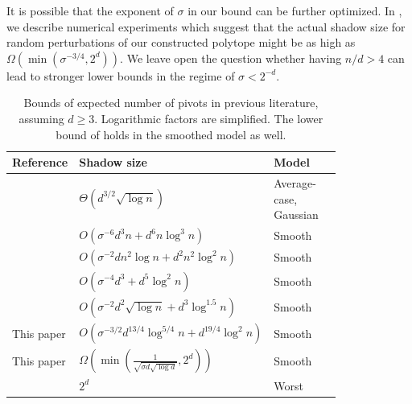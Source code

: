 \documentclass{theoretics}
\begin{document}
It is possible that the exponent of $\sigma$ in our bound can be further optimized.
In , we describe numerical experiments which suggest that
the actual shadow size for random perturbations of our constructed polytope might be as high as $\Omega(\min(\sigma^{-3/4}, 2^d))$.
We leave open the question whether having $n/d > 4$ can lead to stronger
lower bounds in the regime of $\sigma < 2^{-d}$.


\begin{table}[h!]
  \begin{center}
  \renewcommand{\arraystretch}{1.6}
    \begin{tabular}{|l|l|l|l|} %
        \hline
        {\bf Reference} & {\bf Shadow size} & {\bf Model} \\
        \hline
        \cite{b87} & $\Theta(d^{3/2}\sqrt{\log n})$ & \makecell[l]{Average-\\ case,\\ Gaussian } \\ 
        \hline
        \hline
        \cite{ST04} & $O(\sigma^{-6}d^3n + d^6n\log^3 n)$ & Smooth \\
        \hline
        \cite{ds05} & $O(\sigma^{-2}dn^2\log n + d^2n^2\log^2 n)$ & Smooth \\
        \hline
        \cite{ver09} & $O(\sigma^{-4}d^3 + d^5\log^2n)$ & Smooth \\
        \hline
        \cite{DH18} & $O(\sigma^{-2}d^2\sqrt{\log n}+ d^{3}\log ^{1.5}n)$ & Smooth \\
        \hline
        This paper & $O(\sigma^{-3/2} d^{13/4} \log^{5/4} n + d^{19/4} \log^{2} n)$ & Smooth \\
        \hline
        \hline
        This paper & $\Omega(\min(\frac{1}{\sqrt{\sigma d \sqrt{\log d}}},2^d))$ & Smooth \\
        \hline
        \cite{zad73,Mur80, report/Goldfarb83, } & $2^d$ & Worst \\
        \hline
    \end{tabular}
    \caption{Bounds of expected number of pivots in previous literature, assuming $d \geq 3$. Logarithmic factors are simplified. The lower bound of \cite{b87} holds in the smoothed model as well.}\label{tab:shadow_history}
  \end{center}
\end{table}
\end{document}
